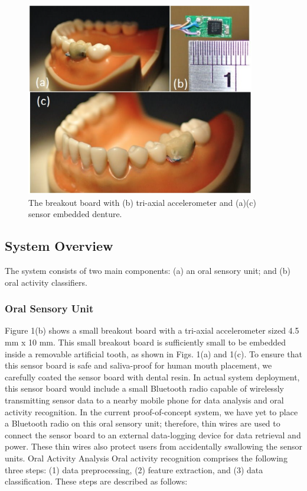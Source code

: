 \begin{figure}[!ht]
\centering
\includegraphics[width=10cm]{image/teeth}
\caption{The breakout board with (b) tri-axial accelerometer and (a)(c) sensor embedded denture.}
\label{teeth_overview}
\end{figure}

\subsection{System Overview}
The system consists of two main components: (a) an oral sensory unit; and (b) oral activity classifiers. 

\subsubsection{Oral Sensory Unit}
Figure 1(b) shows a small breakout board with a tri-axial accelerometer sized 4.5 mm x 10 mm. This small breakout board is sufficiently small to be embedded inside a removable artificial tooth, as shown in Figs. 1(a) and 1(c). To ensure that this sensor board is safe and saliva-proof for human mouth placement, we carefully coated the sensor board with dental resin. In actual system deployment, this sensor board would include a small Bluetooth radio capable of wirelessly transmitting sensor data to a nearby mobile phone for data analysis and oral activity recognition. In the current proof-of-concept system, we have yet to place a Bluetooth radio on this oral sensory unit; therefore, thin wires are used to connect the sensor board to an external data-logging device for data retrieval and power. These thin wires also protect users from accidentally swallowing the sensor units. 
Oral Activity Analysis
Oral activity recognition comprises the following three steps: (1) data preprocessing, (2) feature extraction, and (3) data classification. These steps are described as follows: 


